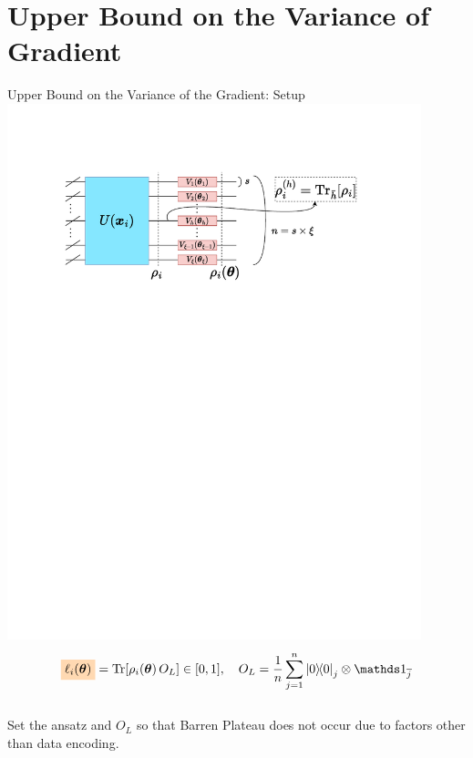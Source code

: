 \documentclass[dvipdfmx,10pt,aspectratio=169]{beamer}
\begin{document}
\section{Upper Bound on the Variance of Gradient}
\begin{frame}{Upper Bound on the Variance of the Gradient: Setup}
    \centering\includegraphics[width=12cm]{setting.pdf}
    $$
    \colorbox{orange!30}{$\ell_i(\bth)$} = \Tr[\rho_i(\bth)\,O_L] \in [0,1],
    \quad
    O_L=\frac1n \sum_{j=1}^{n}\dyad{0}_{j} \otimes \bbid_{\bar{j}}
    $$\\
    \vspace*{5pt}
    Set the ansatz and $O_L$ so that Barren Plateau does not occur due to factors other than data encoding.
\end{frame}
\end{document}
